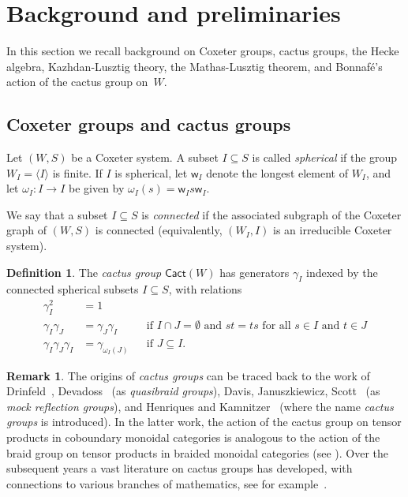 \documentclass[11pt]{article}
\theoremstyle{plain}
\theoremstyle{definition}
\newtheorem{defn}[thm]{Definition}
\newtheorem{remark}[thm]{Remark}
\numberwithin{equation}{section}
\def\cact{\mathsf{Cact}}
\newcommand{\sw}{\mathsf{w}}
\begin{document}
\section{Background and preliminaries}\label{sec:background}

In this section we recall background on Coxeter groups, cactus groups, the Hecke algebra, Kazhdan-Lusztig theory, the Mathas-Lusztig theorem, and Bonnaf\'e's action of the cactus group on~$W$.  


\subsection{Coxeter groups and cactus groups}

Let $(W,S)$ be a Coxeter system. A subset $I\subseteq S$ is called \textit{spherical} if the group $W_I=\langle I\rangle$ is finite. If $I$ is spherical, let $\sw_I$ denote the longest element of $W_I$, and let $\omega_I:I\to I$ be given by $\omega_I(s)=\sw_Is\sw_I$. 

We say that a subset $I\subseteq S$ is \textit{connected} if the associated subgraph of the Coxeter graph of $(W,S)$ is connected (equivalently, $(W_I,I)$ is an irreducible Coxeter system). 



\begin{defn}
The \textit{cactus group} $\cact(W)$ has generators $\gamma_I$ indexed by the connected spherical subsets $I\subseteq S$, with relations
\begin{align*}
\gamma_I^2&=1\\
\gamma_I\gamma_J&=\gamma_J\gamma_I&&\text{if $I\cap J=\emptyset$ and $st=ts$ for all $s\in I$ and $t\in J$}\\
\gamma_I\gamma_J\gamma_I&=\gamma_{\omega_I(J)}&&\text{if $J\subseteq I$}.
\end{align*}
\end{defn} 

\begin{remark}\label{rem:origins}
The origins of \textit{cactus groups} can be traced back to the work of Drinfeld~\cite{Dr:90}, Devadoss~\cite[Definition~6.1.2]{De:99} (as \textit{quasibraid groups}),  Davis, Januszkiewicz, Scott~\cite[Theorem~4.7.2]{DJS:03} (as \textit{mock reflection groups}), and Henriques and Kamnitzer~\cite{HK:06} (where the name \textit{cactus groups} is introduced). In the latter work, the action of the cactus group on tensor products in coboundary monoidal categories is analogous to the action of the braid group on tensor products in braided monoidal categories (see \cite[p.745]{EHKR:10}). Over the subsequent years a vast literature on cactus groups has developed, with connections to various branches of mathematics, see for example~\cite{BGL:19,CGP:20,EHKR:10,Gen:25,TK:09,LY:23}. 
\end{remark}
\end{document}
